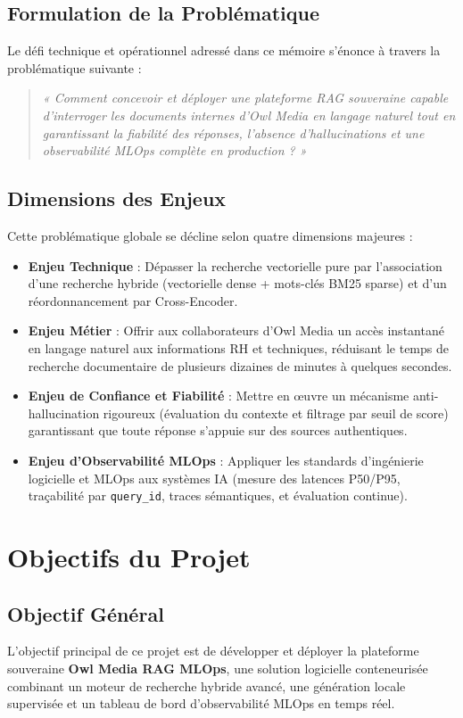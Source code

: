 \subsection{Formulation de la Problématique}
Le défi technique et opérationnel adressé dans ce mémoire s'énonce à travers la problématique suivante :

\begin{quote}
\textit{« Comment concevoir et déployer une plateforme RAG souveraine capable d'interroger les documents internes d'Owl Media en langage naturel tout en garantissant la fiabilité des réponses, l'absence d'hallucinations et une observabilité MLOps complète en production ? »}
\end{quote}

\subsection{Dimensions des Enjeux}
Cette problématique globale se décline selon quatre dimensions majeures :
\begin{itemize}
    \item \textbf{Enjeu Technique} : Dépasser la recherche vectorielle pure par l'association d'une recherche hybride (vectorielle dense + mots-clés BM25 sparse) et d'un réordonnancement par Cross-Encoder.
    \item \textbf{Enjeu Métier} : Offrir aux collaborateurs d'Owl Media un accès instantané en langage naturel aux informations RH et techniques, réduisant le temps de recherche documentaire de plusieurs dizaines de minutes à quelques secondes.
    \item \textbf{Enjeu de Confiance et Fiabilité} : Mettre en œuvre un mécanisme anti-hallucination rigoureux (évaluation du contexte et filtrage par seuil de score) garantissant que toute réponse s'appuie sur des sources authentiques.
    \item \textbf{Enjeu d'Observabilité MLOps} : Appliquer les standards d'ingénierie logicielle et MLOps aux systèmes IA (mesure des latences P50/P95, traçabilité par \texttt{query\_id}, traces sémantiques, et évaluation continue).
\end{itemize}

\section{Objectifs du Projet}

\subsection{Objectif Général}
L'objectif principal de ce projet est de développer et déployer la plateforme souveraine \textbf{Owl Media RAG MLOps}, une solution logicielle conteneurisée combinant un moteur de recherche hybride avancé, une génération locale supervisée et un tableau de bord d'observabilité MLOps en temps réel.

